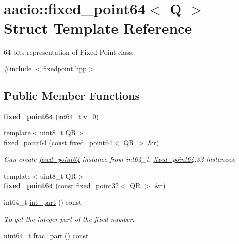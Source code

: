 \hypertarget{structaacio_1_1fixed__point64}{}\section{aacio\+:\+:fixed\+\_\+point64$<$ Q $>$ Struct Template Reference}
\label{structaacio_1_1fixed__point64}


64 bits representation of Fixed Point class.  




{\ttfamily \#include $<$fixedpoint.\+hpp$>$}

\subsection*{Public Member Functions}
\begin{DoxyCompactItemize}
\item 
\mbox{\label{structaacio_1_1fixed__point64_a8a7088580061a0858ff97ed38174a3db}} 
{\bfseries fixed\+\_\+point64} (int64\+\_\+t v=0)
\item 
{\footnotesize template$<$uint8\+\_\+t QR$>$ }\\\mbox{\hyperlink{group__fixedpoint_ga998ecf508857149cd2782eed7683d327}{fixed\+\_\+point64}} (const \mbox{\hyperlink{structaacio_1_1fixed__point64}{fixed\+\_\+point64}}$<$ QR $>$ \&r)
\begin{DoxyCompactList}\small\item\em Can create \mbox{\hyperlink{structaacio_1_1fixed__point64}{fixed\+\_\+point64}} instance from int64\+\_\+t, \mbox{\hyperlink{structaacio_1_1fixed__point64}{fixed\+\_\+point64}},32 instances. \end{DoxyCompactList}\item 
{\footnotesize template$<$uint8\+\_\+t QR$>$ }\\{\bfseries fixed\+\_\+point64} (const \mbox{\hyperlink{structaacio_1_1fixed__point32}{fixed\+\_\+point32}}$<$ QR $>$ \&r)
\item 
int64\+\_\+t \mbox{\hyperlink{structaacio_1_1fixed__point64_a674a0fb3a852c50dedfb2c167113447d}{int\+\_\+part}} () const
\begin{DoxyCompactList}\small\item\em To get the integer part of the fixed number. \end{DoxyCompactList}\item 
uint64\+\_\+t \mbox{\hyperlink{structaacio_1_1fixed__point64_a1b88ef06a8be1383983402df798e295a}{frac\+\_\+part}} () const

\end{DoxyCompactItemize}
